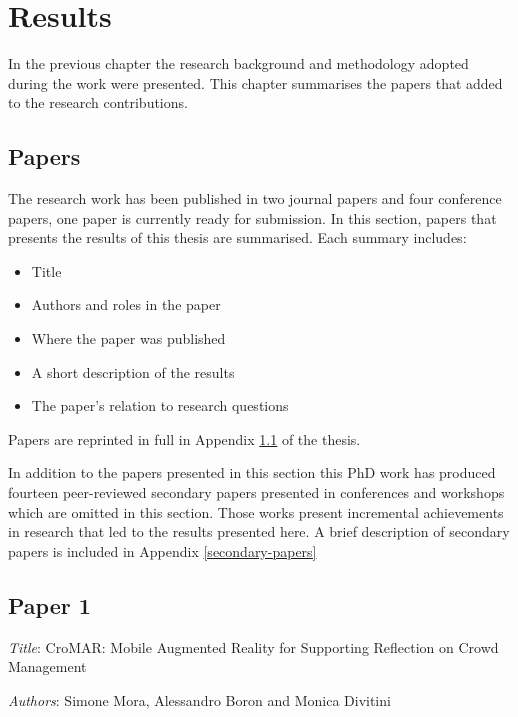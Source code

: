 \chapter{Results}\label{results}


In the previous chapter the research background and methodology adopted during the work were presented. This chapter summarises the papers that added to the research contributions.

\section{Papers}\label{papers}

The research work has been published in two journal papers and four conference papers, one paper is currently ready for submission. In this section, papers that presents the results of this thesis are summarised. Each summary includes: 
\begin{itemize}
	\itemsep1pt\parskip0pt 
	\item Title 
	\item Authors and roles in the paper 
	\item Where the paper was published 
	\item A short description of the results 
	\item The paper's relation to research questions 
\end{itemize}

Papers are reprinted in full in Appendix \ref{papers} of the thesis.

In addition to the papers presented in this section this PhD work has produced fourteen peer-reviewed secondary papers presented in conferences and workshops which are omitted in this section. Those works present incremental achievements in research that led to the results presented here. A brief description of secondary papers is included in Appendix \ref{secondary-papers}

\section[CroMAR: Mobile Augmented Reality for Supporting Reflection on Crowd Management]{Paper 1} \label{paper-1}

\emph{Title}: CroMAR: Mobile Augmented Reality for Supporting Reflection on Crowd Management

\emph{Authors}: Simone Mora, Alessandro Boron and Monica Divitini

